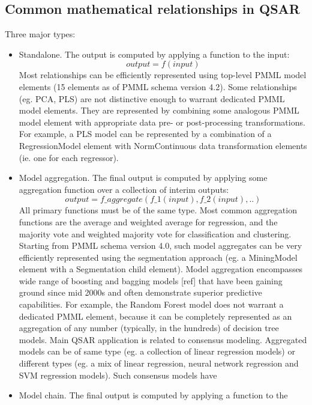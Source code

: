 \documentclass[12pt,letterpaper]{article}
\begin{document}
\subsection{Common mathematical relationships in QSAR}
Three major types:
\begin{itemize}
  \item Standalone. The output is computed by applying a function to the input:
  \begin{equation}
    output = f(input)
  \end{equation}
  Most relationships can be efficiently represented using top-level PMML model
  elements (15 elements as of PMML schema version 4.2). Some relationships (eg. PCA,
  PLS) are not distinctive enough to warrant dedicated PMML model elements.
  They are represented by combining some analogous PMML model element with appropriate 
  data pre- or post-processing transformations. For example, a PLS model can be
  represented by a combination of a RegressionModel element with NormContinuous 
  data transformation elements (ie. one for each regressor).
  \item Model aggregation. The final output is computed by applying some aggregation
  function over a collection of interim outputs:
  \begin{equation}
    output = f\_aggregate(f\_1(input), f\_2(input), ..)
  \end{equation}
  All primary functions must be of the same type. Most common aggregation functions 
  are the average and weighted average for regression, and the majority vote and weighted 
  majority vote for classification and clustering. Starting from PMML schema version
  4.0, such model aggregates can be very efficiently represented using the segmentation
  approach (eg. a MiningModel element with a Segmentation child element).
  Model aggregation encompasses wide range of boosting and bagging models [ref] that
  have been gaining ground since mid 2000s and often demonstrate superior predictive
  capabilities. For example, the Random Forest model does not warrant a dedicated PMML
  element, because it can be completely represented as an aggregation of any number
  (typically, in the hundreds) of decision tree models.
  Main QSAR application is related to consensus modeling. Aggregated models can be 
  of same type (eg. a collection of linear regression models) or different types 
  (eg. a mix of linear regression, neural network regression and SVM regression models).
  Such consensus models have 
  \item Model chain. The final output is computed by applying a function to the

\end{itemize}
\end{document}
